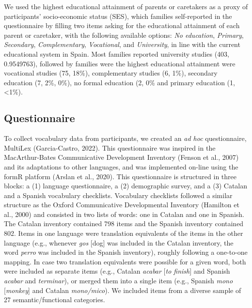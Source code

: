 \documentclass[
  letterpaper,
  DIV=11,
  numbers=noendperiod]{scrartcl}
\begin{document}
We used the highest educational attainment of parents or caretakers as a
proxy of participants' socio-economic status (SES), which families
self-reported in the questionnaire by filling two items asking for the
educational attainment of each parent or caretaker, with the following
available options: \emph{No education}, \emph{Primary},
\emph{Secondary}, \emph{Complementary}, \emph{Vocational}, and
\emph{University}, in line with the current educational system in Spain.
Most families reported university studies (403, 0.9549763), followed by
families were the highest educational attainment were vocational studies
(75, 18\%), complementary studies (6, 1\%), secondary education (7, 2\%,
0\%), no formal education (2, 0\% and primary education (1,
\textless1\%).

\hypertarget{sec-questionnaire}{%
\subsection{Questionnaire}\label{sec-questionnaire}}

To collect vocabulary data from participants, we created an \emph{ad
hoc} questionnaire, MultiLex (Garcia-Castro, 2022). This questionnaire
was inspired in the MacArthur-Bates Communicative Development Inventory
(Fenson et al., 2007) and its adaptations to other languages, and was
implemented on-line using the formR platform (Arslan et al., 2020). This
questionnaire is structured in three blocks: a (1) language
questionnaire, a (2) demographic survey, and a (3) Catalan and a Spanish
vocabulary checklists. Vocabulary checklists followed a similar
structure as the Oxford Communicative Developmental Inventory (Hamilton
et al., 2000) and consisted in two lists of words: one in Catalan and
one in Spanish. The Catalan inventory contained 798 items and the
Spanish inventory contained 802. Items in one language were translation
equivalents of the items in the other language (e.g., whenever
\emph{gos} {[}dog{]} was included in the Catalan inventory, the word
\emph{perro} was included in the Spanish inventory), roughly following a
one-to-one mapping. In case two translation equivalents were possible
for a given word, both were included as separate items (e.g., Catalan
\emph{acabar} {[}\emph{to finish}{]} and Spanish \emph{acabar} and
\emph{terminar}), or merged them into a single item (e.g., Spanish
\emph{mono} {[}\emph{monkey}{]} and Catalan \emph{mono/mico}). We
included items from a diverse sample of 27 semantic/functional
categories.
\end{document}
